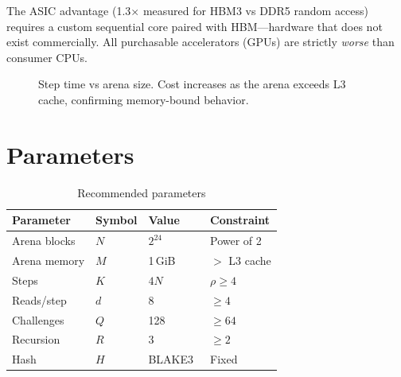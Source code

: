 \documentclass[conference,twocolumn]{IEEEtran}
\begin{document}
The ASIC advantage (1.3$\times$ measured for HBM3 vs DDR5
random access) requires a custom sequential core paired with
HBM---hardware that does not exist commercially. All purchasable
accelerators (GPUs) are strictly \emph{worse} than consumer CPUs.

\begin{figure}[t]
\centering
{}
\caption{Step time vs arena size. Cost increases as the arena
exceeds L3 cache, confirming memory-bound behavior.}
\label{fig:scaling}
\end{figure}

\section{Parameters}

\begin{table}[!ht]
\centering
\caption{Recommended parameters}
\begin{tabular*}{\columnwidth}{@{\extracolsep{\fill}}llll@{}}
\toprule
Parameter & Symbol & Value & Constraint \\
\midrule
Arena blocks & $N$ & $2^{24}$ & Power of 2 \\
Arena memory & $M$ & 1\,GiB & $>$ L3 cache \\
Steps & $K$ & $4N$ & $\rho \geq 4$ \\
Reads/step & $d$ & 8 & $\geq 4$ \\
Challenges & $Q$ & 128 & $\geq 64$ \\
Recursion & $R$ & 3 & $\geq 2$ \\
Hash & $H$ & BLAKE3~\cite{blake3} & Fixed \\
\bottomrule
\end{tabular*}
\label{tab:params}
\end{table}
\end{document}
